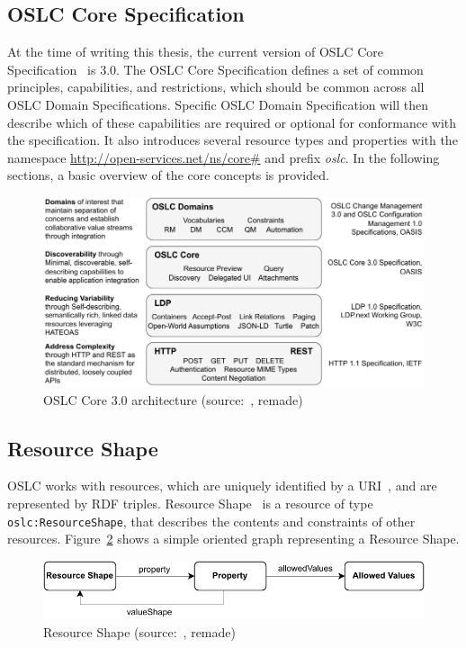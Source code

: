 \subsection{OSLC Core Specification}
\label{sec:oslc_core_specification}
At the time of writing this thesis, the current version of OSLC Core Specification \cite{oslc_core_specification} is 3.0. The OSLC Core Specification defines a set of common principles, capabilities, and restrictions, which should be common across all OSLC Domain Specifications. Specific OSLC Domain Specification will then describe which of these capabilities are required or optional for conformance with the specification. It also introduces several resource types and properties with the namespace \url{http://open-services.net/ns/core\#} and prefix \emph{oslc}. In the following sections, a basic overview of the core concepts is provided.

\begin{figure}[hbt]
  \centering
  \includegraphics[width= \linewidth]{figures/OSLC-core.pdf}
  \caption{OSLC Core 3.0 architecture (source: \cite{oslc_core_specification}, remade)}
  \label{fig:oslc_core_architecture}
\end{figure}

\subsection*{Resource Shape}
OSLC works with resources, which are uniquely identified by a URI \cite{uri_rfc}, and are represented by RDF triples. Resource Shape \cite{oslc_core_resource_shape} is a resource of type \texttt{oslc:ResourceShape}, that describes the contents and constraints of other resources. Figure \ref{fig:resource_shape} shows a simple oriented graph representing a Resource Shape.

\begin{figure}[hbt]
  \centering
  \includegraphics[width=.8 \linewidth]{figures/resource-shape.pdf}
  \caption{Resource Shape (source: \cite{oslc_core_resource_shape}, remade)}
  \label{fig:resource_shape}
\end{figure}

